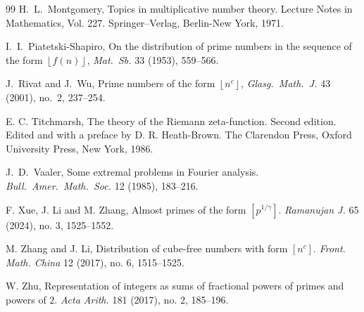 \documentclass[12pt, reqno, twoside, letterpaper]{amsart}
\numberwithin{equation}{section}
\def\fl#1{\left\lfloor#1\right\rfloor}
\theoremstyle{customthm}
\theoremstyle{customrem}
\begin{document}
\begin{thebibliography}{99}
H.~L.~Montgomery,
Topics in multiplicative number theory. Lecture Notes in Mathematics, Vol. 227. Springer--Verlag, Berlin-New York, 1971.


I.~I.~Piatetski-Shapiro, 
On the distribution of prime numbers in the sequence of the form $\fl{f(n)}$,
\emph{Mat.\ Sb.} 33 (1953), 559--566.   


J.~Rivat and J.~Wu,
Prime numbers of the form $\fl{n^c}$,
\emph{Glasg.\ Math.\ J.} 43 (2001), no.~2, 237--254.    


E. C. Titchmarsh, 
The theory of the Riemann zeta-function.
Second edition. Edited and with a preface by D. R. Heath-Brown. The Clarendon Press, Oxford University Press, New York, 1986.

	

J.~D.~Vaaler,
Some extremal problems in Fourier analysis. 
\emph{Bull.\ Amer.\ Math.\ Soc.} 12 (1985), 183--216.    

F. Xue, J. Li and M. Zhang,
Almost primes of the form $[p^{1/\gamma }]$. 
\emph{Ramanujan J.} 65 (2024), no. 3, 1525--1552. 
    
    
M. Zhang and J. Li,
Distribution of cube-free numbers with form $[n^c]$. 
\emph{Front. Math. China} 12 (2017), no. 6, 1515--1525.    


W. Zhu,
Representation of integers as sums of fractional powers of primes and powers of $2$.
\emph{Acta Arith.} 181 (2017), no. 2, 185--196.

\end{thebibliography}


	
\end{document}
